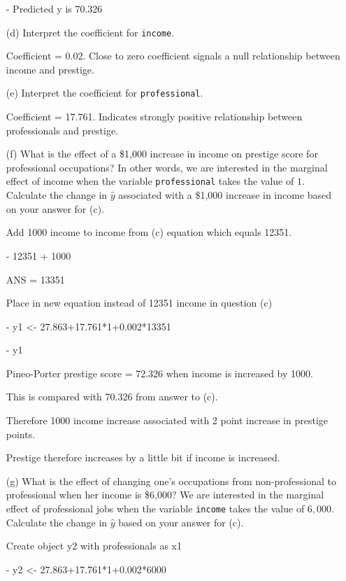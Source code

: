 \documentclass[12pt,letterpaper]{article}
\begin{document}
\begin{enumerate}
-	Predicted y is 70.326
\newpage
	\item [(d)]
	Interpret the coefficient for \texttt{income}.

Coefficient = 0.02. Close to zero coefficient signals a null relationship between income and prestige.
	\vspace{10cm}	
	\item [(e)]
	Interpret the coefficient for \texttt{professional}.

Coefficient = 17.761. Indicates strongly positive relationship between professionals and prestige. 
	
	\newpage
	\item [(f)]
	What is the effect of a \$1,000 increase in income on prestige score for professional occupations? In other words, we are interested in the marginal effect of income when the variable \texttt{professional} takes the value of $1$. Calculate the change in $\hat{y}$ associated with a \$1,000 increase in income based on your answer for (c).
	
Add 1000 income to income from (c) equation which equals 12351. 

- 12351 + 1000 

ANS = 13351

Place in new equation instead of 12351 income in  question (c)

- y1 <- 27.863+17.761*1+0.002*13351

- y1

Pineo-Porter prestige score = 72.326 when income is increased by 1000.

This is compared with 70.326 from answer to (c). 

Therefore 1000 income increase associated with 2 point increase in prestige points. 

Prestige therefore increases by a little bit if income is increased.

	\vspace{10cm}
	
	
	\item [(g)]
	What is the effect of changing one's occupations from non-professional to professional when her income is \$6,000? We are interested in the marginal effect of professional jobs when the variable \texttt{income} takes the value of $6,000$. Calculate the change in $\hat{y}$ based on your answer for (c).
	
Create object y2 with professionals as x1

- y2 <- 27.863+17.761*1+0.002*6000


\end{enumerate}
\end{document}

